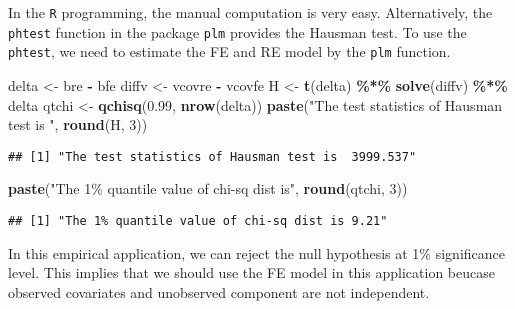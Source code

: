 \documentclass[
  12pt,
]{article}
\newenvironment{Shaded}{\begin{snugshade}}{\end{snugshade}}
\newcommand{\DecValTok}[1]{\textcolor[rgb]{0.00,0.00,0.81}{#1}}
\newcommand{\FloatTok}[1]{\textcolor[rgb]{0.00,0.00,0.81}{#1}}
\newcommand{\KeywordTok}[1]{\textcolor[rgb]{0.13,0.29,0.53}{\textbf{#1}}}
\newcommand{\NormalTok}[1]{#1}
\newcommand{\OperatorTok}[1]{\textcolor[rgb]{0.81,0.36,0.00}{\textbf{#1}}}
\newcommand{\StringTok}[1]{\textcolor[rgb]{0.31,0.60,0.02}{#1}}
\begin{document}
In the \texttt{R} programming, the manual computation is very easy.
Alternatively, the \texttt{phtest} function in the package \texttt{plm}
provides the Hausman test. To use the \texttt{phtest}, we need to
estimate the FE and RE model by the \texttt{plm} function.

\begin{Shaded}
\begin{Highlighting}[]
\NormalTok{delta \textless{}{-}}\StringTok{ }\NormalTok{bre }\OperatorTok{{-}}\StringTok{ }\NormalTok{bfe}
\NormalTok{diffv \textless{}{-}}\StringTok{ }\NormalTok{vcovre }\OperatorTok{{-}}\StringTok{ }\NormalTok{vcovfe}
\NormalTok{H \textless{}{-}}\StringTok{ }\KeywordTok{t}\NormalTok{(delta) }\OperatorTok{\%*\%}\StringTok{ }\KeywordTok{solve}\NormalTok{(diffv) }\OperatorTok{\%*\%}\StringTok{ }\NormalTok{delta}
\NormalTok{qtchi \textless{}{-}}\StringTok{ }\KeywordTok{qchisq}\NormalTok{(}\FloatTok{0.99}\NormalTok{, }\KeywordTok{nrow}\NormalTok{(delta))}
\KeywordTok{paste}\NormalTok{(}\StringTok{"The test statistics of Hausman test is "}\NormalTok{, }\KeywordTok{round}\NormalTok{(H, }\DecValTok{3}\NormalTok{))}
\end{Highlighting}
\end{Shaded}

\begin{verbatim}
## [1] "The test statistics of Hausman test is  3999.537"
\end{verbatim}

\begin{Shaded}
\begin{Highlighting}[]
\KeywordTok{paste}\NormalTok{(}\StringTok{"The 1\% quantile value of chi{-}sq dist is"}\NormalTok{, }\KeywordTok{round}\NormalTok{(qtchi, }\DecValTok{3}\NormalTok{))}
\end{Highlighting}
\end{Shaded}

\begin{verbatim}
## [1] "The 1% quantile value of chi-sq dist is 9.21"
\end{verbatim}

In this empirical application, we can reject the null hypothesis at 1\%
significance level. This implies that we should use the FE model in this
application beucase observed covariates and unobserved component are not
independent.
\end{document}
